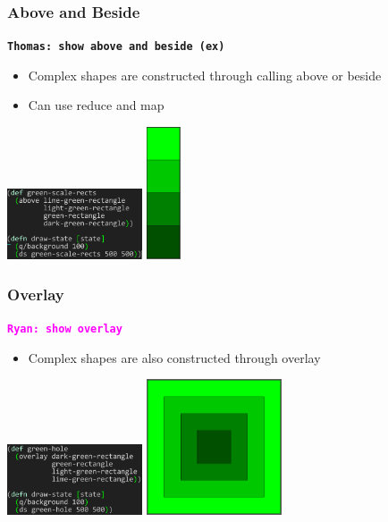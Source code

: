 \documentclass{beamer}
\newcommand{\comment}[1]{{\bf \tt  {#1}}}
\newcommand{\thcomment}[1]{\textcolor{BestBlue}{\comment{Thomas: {#1}}}}
\newcommand{\rmcomment}[1]{\textcolor{magenta}{\comment{Ryan: {#1}}}}
\begin{document}
\begin{frame}
\frametitle{Above and Beside}
\thcomment{show above and beside (ex)}
	\begin{itemize}
		\item Complex shapes are constructed through calling above or beside
		\item Can use reduce and map
	\end{itemize}
	\includegraphics[width=4cm]{PresentationImages/greenScaleRects.png}
	\includegraphics[width=1cm]{PresentationImages/greenScaleTower.png}
\end{frame}

\begin{frame}
\frametitle{Overlay}
\rmcomment{show overlay}
	\begin{itemize}
		\item Complex shapes are also constructed through overlay
	\end{itemize}
	\includegraphics[width=4cm]{PresentationImages/fcsGreenHoleCode.png}
	\includegraphics[width=4cm]{PresentationImages/greenHole.png}
\end{frame}
\end{document}
